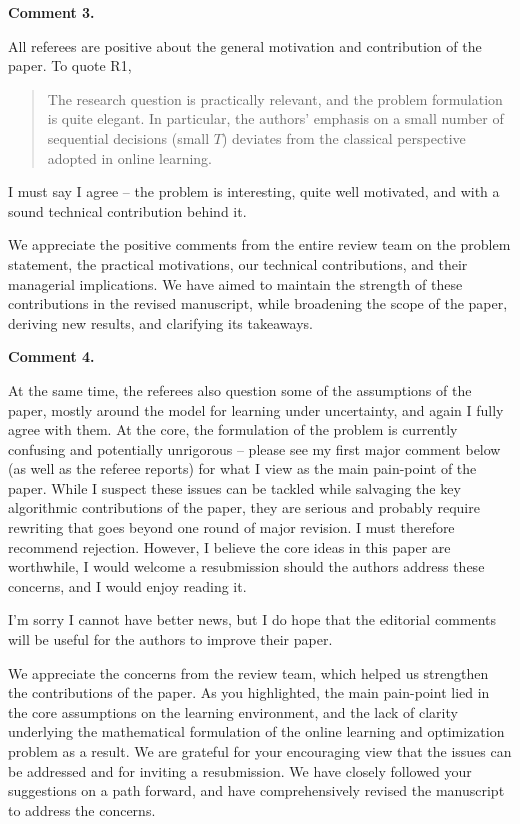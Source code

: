 \documentclass[11pt]{article}
\begin{document}
\begin{commentBox}
\textbf{Comment 3.}\label{AE:3}

All referees are positive about the general motivation and contribution of the paper. To quote R1,
\begin{quote}
    The research question is practically relevant, and the problem formulation is quite elegant. In particular, the authors’ emphasis on a small number of sequential decisions (small $T$) deviates from the classical perspective adopted in online learning.
\end{quote}
I must say I agree – the problem is interesting, quite well motivated, and with a sound technical contribution behind it.

\end{commentBox}

We appreciate the positive comments from the entire review team on the problem statement, the practical motivations, our technical contributions, and their managerial implications. We have aimed to maintain the strength of these contributions in the revised manuscript, while broadening the scope of the paper, deriving new results, and clarifying its takeaways.

\begin{commentBox}
\textbf{Comment 4.}\label{AE:4}

At the same time, the referees also question some of the assumptions of the paper, mostly around the model for learning under uncertainty, and again I fully agree with them. At the core, the formulation of the problem is currently confusing and potentially unrigorous – please see my first major comment below (as well as the referee reports) for what I view as the main pain-point of the paper. While I suspect these issues can be tackled while salvaging the key algorithmic contributions of the paper, they are serious and probably require rewriting that goes beyond one round of major revision. I must therefore recommend rejection. However, I believe the core ideas in this paper are worthwhile, I would welcome a resubmission should the authors address these concerns, and I would enjoy reading it.

I’m sorry I cannot have better news, but I do hope that the editorial comments will be useful for the authors to improve their paper.
\end{commentBox}

We appreciate the concerns from the review team, which helped us strengthen the contributions of the paper. As you highlighted, the main pain-point lied in the core assumptions on the learning environment, and the lack of clarity underlying the mathematical formulation of the online learning and optimization problem as a result. We are grateful for your encouraging view that the issues can be addressed and for inviting a resubmission. We have closely followed your suggestions on a path forward, and have comprehensively revised the manuscript to address the concerns.
\end{document}
